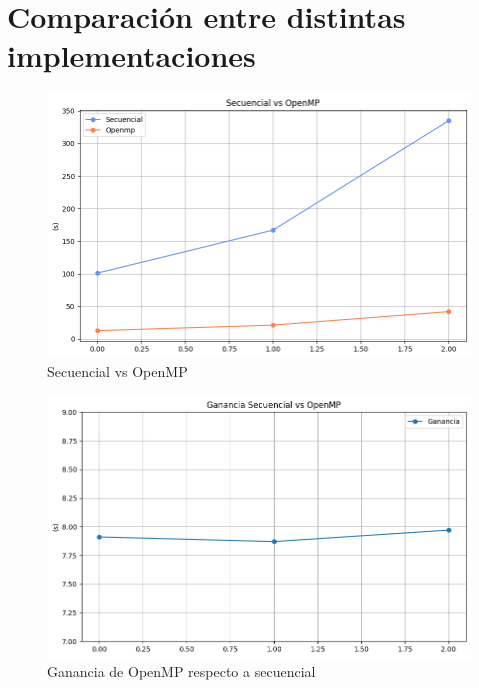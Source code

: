 \chapter{Comparación entre distintas implementaciones}

\begin{figure}[H]
	\centering
	\includegraphics[scale=0.5]{imagenes/sec_openmp.png}  
	\caption{Secuencial vs OpenMP}
	\label{fig:sec_openmp}
\end{figure}

\begin{figure}[H]
	\centering
	\includegraphics[scale=0.5]{imagenes/ganancia_sec_openmp.png}  
	\caption{Ganancia de OpenMP respecto a secuencial}
	\label{fig:ganancia_sec_openmp}
\end{figure}

